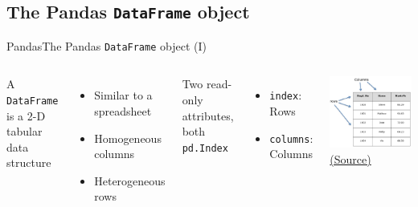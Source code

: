 \documentclass[10pt,compress]{beamer} %
\begin{document}
\subsection{The Pandas \texttt{DataFrame} object}
\begin{frame}{Pandas}{The Pandas \texttt{DataFrame} object (I)}
	\begin{columns}
		A \texttt{DataFrame} is a 2-D tabular data structure
		\begin{itemize}
			\item Similar to a spreadsheet
			\item Homogeneous columns
			\item Heterogeneous rows
		\end{itemize}
		Two read-only attributes, both \texttt{pd.Index}
		\begin{itemize}
			\item \texttt{index}: Rows
			\item \texttt{columns}: Columns
		\end{itemize}

		\centering \includegraphics[width=\textwidth]{figs/structure_table.jpg}\\
		\tiny \href{https://www.tutorialspoint.com/python\_pandas/python\_pandas\_dataframe.htm}{(Source)}
	\end{columns}
\end{frame}
\end{document}
